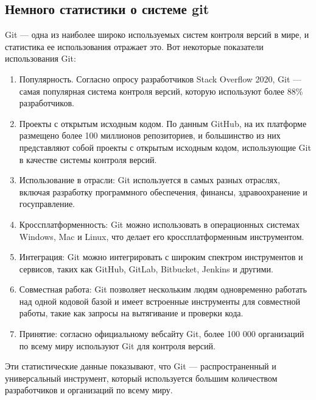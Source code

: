 \documentclass[letterpaper,10pt,russian]{sphinxmanual}
\begin{document}
\subsection{Немного статистики о системе git}
\label{\detokenize{educational_materials/git_base/content:id12}}
\sphinxAtStartPar
Git — одна из наиболее широко используемых систем контроля версий в мире, и статистика ее использования отражает это. Вот некоторые показатели использования Git:
\begin{enumerate}
%
\item {} 
\sphinxAtStartPar
Популярность. Согласно опросу разработчиков Stack Overflow 2020, Git — самая популярная система контроля версий, которую используют более 88\% разработчиков.

\item {} 
\sphinxAtStartPar
Проекты с открытым исходным кодом. По данным GitHub, на их платформе размещено более 100 миллионов репозиториев, и большинство из них представляют собой проекты с открытым исходным кодом, использующие Git в качестве системы контроля версий.

\item {} 
\sphinxAtStartPar
Использование в отрасли: Git используется в самых разных отраслях, включая разработку программного обеспечения, финансы, здравоохранение и госуправление.

\item {} 
\sphinxAtStartPar
Кроссплатформенность: Git можно использовать в операционных системах Windows, Mac и Linux, что делает его кроссплатформенным инструментом.

\item {} 
\sphinxAtStartPar
Интеграция: Git можно интегрировать с широким спектром инструментов и сервисов, таких как GitHub, GitLab, Bitbucket, Jenkins и другими.

\item {} 
\sphinxAtStartPar
Совместная работа: Git позволяет нескольким людям одновременно работать над одной кодовой базой и имеет встроенные инструменты для совместной работы, такие как запросы на вытягивание и проверки кода.

\item {} 
\sphinxAtStartPar
Принятие: согласно официальному веб\sphinxhyphen{}сайту Git, более 100 000 организаций по всему миру используют Git для контроля версий.

\end{enumerate}

\sphinxAtStartPar
Эти статистические данные показывают, что Git — распространенный и универсальный инструмент, который используется большим количеством разработчиков и организаций по всему миру.
\end{document}

